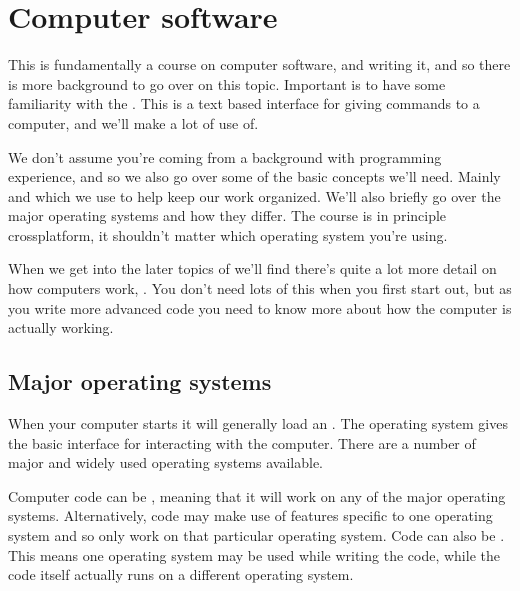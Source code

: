 \documentclass[letterpaper,10pt,british]{sphinxmanual}
\begin{document}
\chapter{Computer software}
\label{\detokenize{chapters/computer_software:computer-software}}\label{\detokenize{chapters/computer_software::doc}}
\sphinxAtStartPar
This is fundamentally a course on computer software, and writing it, and so there is more background to go over on this topic. Important is to have some familiarity with the . This is a text based interface for giving commands to a computer, and we’ll make a lot of use of.

\sphinxAtStartPar
We don’t assume you’re coming from a background with programming experience, and so we also go over some of the basic concepts we’ll need. Mainly  and  which we use to help keep our work organized. We’ll also briefly go over the major operating systems and how they differ. The course is in principle cross\sphinxhyphen{}platform, it shouldn’t matter which operating system you’re using.

\sphinxAtStartPar
When we get into the later topics of {\hyperref[\detokenize{chapters/programming_fundamentals:programming-fundamentals}]{}} we’ll find there’s quite a lot more detail on how computers work, . You don’t need lots of this when you first start out, but as you write more advanced code you need to know more about how the computer is actually working.

\sphinxstepscope


\section{Major operating systems}
\label{\detokenize{chapters/computer_software/major_operating_systems:major-operating-systems}}\label{\detokenize{chapters/computer_software/major_operating_systems:operating-systems}}\label{\detokenize{chapters/computer_software/major_operating_systems::doc}}
\sphinxAtStartPar
When your computer starts it will generally load an . The operating system gives the basic interface for interacting with the computer. There are a number of major and widely used operating systems available.

\sphinxAtStartPar
Computer code can be , meaning that it will work on any of the major operating systems. Alternatively, code may make use of features specific to one operating system and so only work on that particular operating system. Code can also be . This means one operating system may be used while writing the code, while the code itself actually runs on a different operating system.
\end{document}
